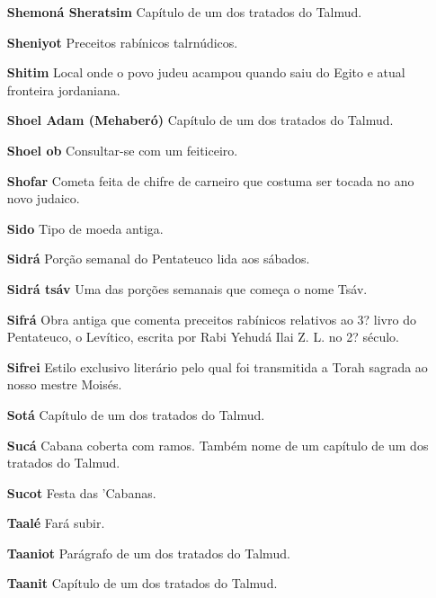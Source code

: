\begin{itemize}
\item[\textbf{Shemoná Sheratsim}] Capítulo de um dos tratados do Talmud.

\item[\textbf{Sheniyot}] Preceitos rabínicos talrnú­dicos.

\item[\textbf{Shitim}] Local onde o povo judeu acampou quando saiu do Egito e
atual fronteira jordaniana.

\item[\textbf{Shoel Adam (Mehaberó)}] Capítulo de um dos tratados do Talmud.

\item[\textbf{Shoel ob}] Consultar-se com um feiti­ceiro.

\item[\textbf{Shofar}] Cometa feita de chifre de car­neiro que costuma ser
tocada no ano novo judaico.

\item[\textbf{Sido}] Tipo de moeda antiga.

\item[\textbf{Sidrá}] Porção semanal do Pentateu­co lida aos sábados.

\item[\textbf{Sidrá tsáv}] Uma das porções sema­nais que começa o nome Tsáv.

\item[\textbf{Sifrá}] Obra antiga que comenta pre­ceitos rabínicos relativos
ao 3? livro do Pentateuco, o Levítico, escrita por Ra­bi Yehudá Ilai Z.
L. no 2? século.

\item[\textbf{Sifrei}] Estilo exclusivo literário pelo qual
foi transmitida a Torah sagrada ao nosso mestre Moisés.

\item[\textbf{Sotá}] Capítulo de um dos tratados do Talmud.

\item[\textbf{Sucá}] Cabana coberta com ramos. Também nome de um capítulo de um dos
tratados do Talmud.

\item[\textbf{Sucot}] Festa das 'Cabanas.

\item[\textbf{Taalé}] Fará subir.

\item[\textbf{Taaniot}] Parágrafo de um dos trata­dos do Talmud.

\item[\textbf{Taanit}] Capítulo de um dos tratados do Talmud.


\end{itemize}
